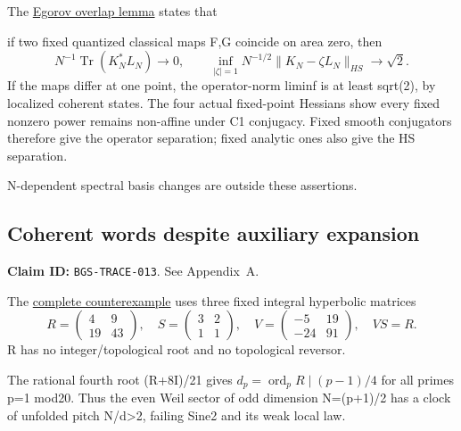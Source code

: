 The \href{https://github.com/ChurilovMaksim/BGS/blob/main/mathematics/egorov_overlap_rigidity.md}{Egorov overlap lemma} states that

\begin{theorem}\label{pass2:frontier-fm-016}

if two
fixed quantized classical maps F,G coincide on area zero, then
\[
N^{-1}\operatorname{Tr}(K_N^*L_N)\to0,\qquad
\inf_{|\zeta|=1}N^{-1/2}\|K_N-\zeta L_N\|_{HS}\to\sqrt2.
\]
If the maps differ at one point, the operator-norm liminf is at least
sqrt(2), by localized coherent states. The four actual fixed-point
Hessians show every fixed nonzero power remains non-affine under C1
conjugacy. Fixed smooth conjugators therefore give the operator separation;
fixed analytic ones also give the HS separation.

\end{theorem}

N-dependent spectral
basis changes are outside these assertions.

\hypertarget{coherent-words-despite-auxiliary-expansion}{%
\subsection{Coherent words despite auxiliary expansion}\label{coherent-words-despite-auxiliary-expansion}}

\textbf{Claim ID:} \texttt{BGS-TRACE-013}. See Appendix~A.

\begin{theorem}\label{pass2:frontier-trace-013}

The \href{https://github.com/ChurilovMaksim/BGS/blob/main/mathematics/arithmetic_word_expansion_obstruction.md}{complete counterexample}
uses three fixed integral hyperbolic matrices
\[
R=\begin{pmatrix}4&9\\19&43\end{pmatrix},\quad
S=\begin{pmatrix}3&2\\1&1\end{pmatrix},\quad
V=\begin{pmatrix}-5&19\\-24&91\end{pmatrix},\quad VS=R.
\]
R has no integer/topological root and no topological reversor.

The rational fourth root (R+8I)/21 gives
\(d_p=\operatorname{ord}_pR\mid(p-1)/4\) for all primes p=1 mod20.
Thus the even Weil sector of odd dimension N=(p+1)/2 has a clock of
unfolded pitch N/d\textgreater2, failing Sine2 and its weak local law.

\end{theorem}

